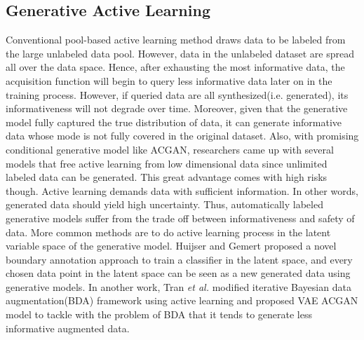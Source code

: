 \documentclass[letterpaper]{article}
\begin{document}
\subsection{Generative Active Learning}
Conventional pool-based active learning method draws data to be labeled from the large unlabeled data pool. However, data in the unlabeled dataset are spread all over the data space. Hence, after exhausting the most informative data, the acquisition function will begin to query less informative data later on in the training process. However, if queried data are all synthesized(i.e. generated), its informativeness will not degrade over time. Moreover, given that the generative model fully captured the true distribution of data, it can generate informative data whose mode is not fully covered in the original dataset\cite{Zhu2017GenerativeAA}. Also, with promising conditional generative model like ACGAN, researchers came up with several models that free active learning from low dimensional data since unlimited labeled data can be generated\cite{kong2019active}. This great advantage comes with high risks though. Active learning demands data with sufficient information. In other words, generated data should yield high uncertainty. Thus, automatically labeled generative models suffer from the trade off between informativeness and safety of data. More common methods are to do active learning process in the latent variable space of the generative model. Huijser and Gemert proposed a novel boundary annotation approach to train a classifier in the latent space, and every chosen data point in the latent space can be seen as a new generated data using generative models\cite{huijser2017active}. In another work, Tran \emph{et al.} modified iterative Bayesian data augmentation(BDA) framework using active learning and proposed VAE ACGAN model to tackle with the problem of BDA that it tends to generate less informative augmented data\cite{tran2019bayesian}.

  
\end{document}
